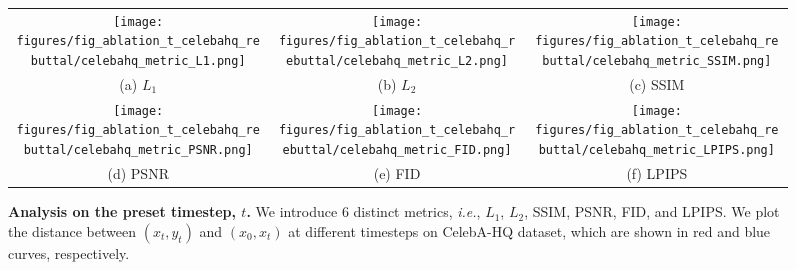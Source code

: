 \begin{figure*}[tp]
\centering
\begin{tabular}{ccc}
\begin{minipage}[t]{0.3\linewidth}\texttt{[image: figures/fig\_ablation\_t\_celebahq\_rebuttal/celebahq\_metric\_L1.png]}\end{minipage} &
\begin{minipage}[t]{0.3\linewidth}\texttt{[image: figures/fig\_ablation\_t\_celebahq\_rebuttal/celebahq\_metric\_L2.png]}\end{minipage} &
\begin{minipage}[t]{0.3\linewidth}\texttt{[image: figures/fig\_ablation\_t\_celebahq\_rebuttal/celebahq\_metric\_SSIM.png]}\end{minipage} \\
(a) $L_1$ & (b) $L_2$ & (c) SSIM \\
\begin{minipage}[t]{0.3\linewidth}\texttt{[image: figures/fig\_ablation\_t\_celebahq\_rebuttal/celebahq\_metric\_PSNR.png]}\end{minipage} &
\begin{minipage}[t]{0.3\linewidth}\texttt{[image: figures/fig\_ablation\_t\_celebahq\_rebuttal/celebahq\_metric\_FID.png]}\end{minipage} &
\begin{minipage}[t]{0.3\linewidth}\texttt{[image: figures/fig\_ablation\_t\_celebahq\_rebuttal/celebahq\_metric\_LPIPS.png]}\end{minipage} \\
(d) PSNR & (e) FID & (f) LPIPS
\end{tabular}
\caption{
    \textbf{Analysis on the preset timestep, $t$.}
    We introduce 6 distinct metrics, \textit{i.e.}, $L_1$, $L_2$, SSIM, PSNR, FID, and LPIPS.
    We plot the distance between $(x_t,y_t)$ and $(x_0, x_t)$ at different timesteps on CelebA-HQ dataset, which are shown in red and blue curves, respectively.
}
\label{fig:ablation_t_celebahq}
\vspace{-10pt}
\end{figure*}

